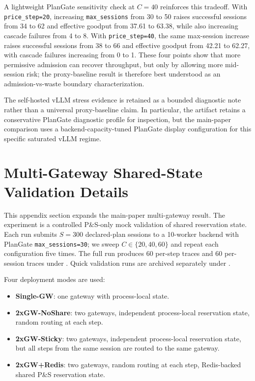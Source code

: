 \documentclass[sigconf,anonymous]{acmart}
\begin{document}
A lightweight PlanGate sensitivity check at $C{=}40$ reinforces this tradeoff. With \texttt{price\_step=20}, increasing \texttt{max\_sessions} from 30 to 50 raises successful sessions from 34 to 62 and effective goodput from 37.61 to 63.38, while also increasing cascade failures from 4 to 8. With \texttt{price\_step=40}, the same max-session increase raises successful sessions from 38 to 66 and effective goodput from 42.21 to 62.27, with cascade failures increasing from 0 to 1. These four points show that more permissive admission can recover throughput, but only by allowing more mid-session risk; the proxy-baseline result is therefore best understood as an admission-vs-waste boundary characterization.

The self-hosted vLLM stress evidence is retained as a bounded diagnostic note rather than a universal proxy-baseline claim. In particular, the artifact retains a conservative PlanGate diagnostic profile for inspection, but the main-paper comparison uses a backend-capacity-tuned PlanGate display configuration for this specific saturated vLLM regime.

\section{Multi-Gateway Shared-State Validation Details}
\label{sec:multigateway_appendix}

This appendix section expands the main-paper multi-gateway result. The experiment is a controlled P\&S-only mock validation of shared reservation state. Each run submits $S{=}300$ declared-plan sessions to a 10-worker backend with PlanGate \texttt{max\_sessions=30}; we sweep $C\in\{20,40,60\}$ and repeat each configuration five times. The full run produces 60 per-step traces and 60 per-session traces under . Quick validation runs are archived separately under .

Four deployment modes are used:
\begin{itemize}
  \item \textbf{Single-GW}: one gateway with process-local state.
  \item \textbf{2xGW-NoShare}: two gateways, independent process-local reservation state, random routing at each step.
  \item \textbf{2xGW-Sticky}: two gateways, independent process-local reservation state, but all steps from the same session are routed to the same gateway.
  \item \textbf{2xGW+Redis}: two gateways, random routing at each step, Redis-backed shared P\&S reservation state.
\end{itemize}
\end{document}
